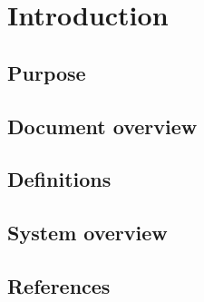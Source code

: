\chapter{Introduction}
	\section{Purpose}
	\section{Document overview}
	\section{Definitions}
	\section{System overview}
	\section{References}